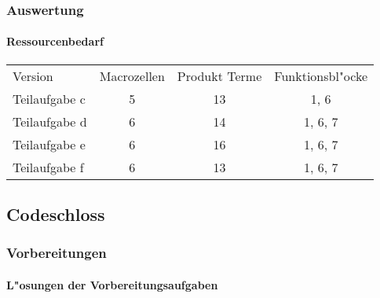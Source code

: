 \documentclass [] {scrartcl}
\begin{document}
  \subsubsection{Auswertung}
  \paragraph{Ressourcenbedarf}
  \begin{table}
    \begin{tabular}{lccc}
      Version & Macrozellen & Produkt Terme & Funktionsbl"ocke\\
      Teilaufgabe c & 5 & 13 & 1, 6\\
      Teilaufgabe d & 6 & 14 & 1, 6, 7\\
      Teilaufgabe e & 6 & 16 & 1, 6, 7\\
      Teilaufgabe f & 6 & 13 & 1, 6, 7\\
    \end{tabular}
  \end{table}

  \subsection{Codeschloss}
  \subsubsection{Vorbereitungen}
  \paragraph{L"osungen der Vorbereitungsaufgaben}
\end{document}
